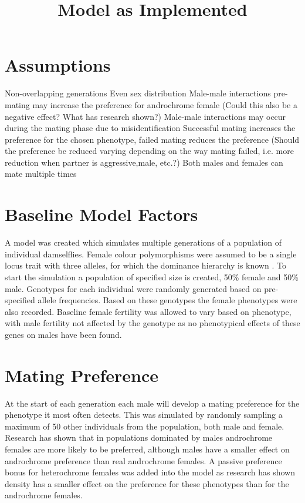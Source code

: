 \documentclass{article}
\title{Model as Implemented}
\date{\vspace{-5ex}}
\begin{document}
\maketitle

\section{Assumptions}
Non-overlapping generations \cite{Svensson2005}
Even sex distribution
Male-male interactions pre-mating may increase the preference for androchrome female (Could this also be a negative effect? What has research shown?)
Male-male interactions may occur during the mating phase due to misidentification \cite{Blow2019}
Successful mating increases the preference for the chosen phenotype, failed mating reduces the preference (Should the preference be reduced varying depending on the way mating failed, i.e. more reduction when partner is aggressive,male, etc.?)
Both males and females can mate multiple times \cite{Gosden2007}





\section{Baseline Model Factors}
A model was created which simulates multiple generations of a population of individual damselflies. Female colour polymorphisms were assumed to be a single locus trait with three alleles, for which the dominance hierarchy is known \cite{Cordero1990}. To start the simulation a population of specified size is created, 50\% female and 50\% male. Genotypes for each individual were randomly generated based on pre-specified allele frequencies. Based on these genotypes the female phenotypes were also recorded. Baseline female fertility was allowed to vary based on phenotype, with male fertility not affected by the genotype as no phenotypical effects of these genes on males have been found.

\section{Mating Preference}
At the start of each generation each male will develop a mating preference for the phenotype it most often detects. This was simulated by randomly sampling a maximum of 50 other individuals from the population, both male and female. Research has shown that in populations dominated by males androchrome females are more likely to be preferred\cite{}, although males have a smaller effect on androchrome preference than real androchrome females. A passive preference bonus for heterochrome females was added into the model as research has shown density has a smaller effect on the preference for these phenotypes than for the androchrome females.
\end{document}
